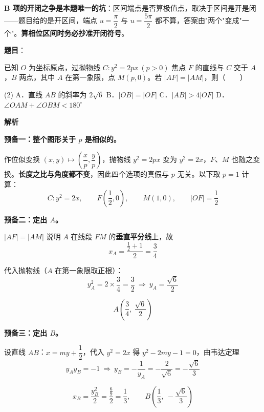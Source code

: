 \begin{answer}
\begin{gktip}
\textbf{B 项的开闭之争是本题唯一的坑}：区间端点是否算极值点，取决于区间是开是闭——题目给的是开区间，端点 $u=\dfrac\pi2$ 与 $u=\dfrac{5\pi}2$ 都不算，答案由"两个"变成"一个"。\textbf{算相位区间时务必抄准开闭符号}。
\end{gktip}


\par\medskip

\end{answer}
\begin{answer}

\textbf{题目}：

已知 $O$ 为坐标原点，过抛物线 $C:y^{2}=2px\ (p>0)$ 焦点 $F$ 的直线与 $C$ 交于 $A$，$B$ 两点，其中 $A$ 在第一象限，点 $M(p,0)$。若 $|AF|=|AM|$，则\mbox{（　　）}

\begin{gkopts}(2)
\task A．直线 $AB$ 的斜率为 $2\sqrt6$
\task B．$|OB|=|OF|$
\task C．$|AB|>4|OF|$
\task D．$\angle OAM+\angle OBM<180^\circ$
\end{gkopts}

\textbf{解析}

\textbf{预备一：整个图形关于 $p$ 是相似的。}

作位似变换 $(x,y)\mapsto\left(\dfrac xp,\dfrac yp\right)$，抛物线 $y^{2}=2px$ 变为 $y^{2}=2x$，$F$、$M$ 也随之变换。\textbf{长度之比与角度都不变}，因此四个选项的真假与 $p$ 无关。以下取 $p=1$ 计算：
\nopagebreak[4]
\[C:y^{2}=2x,\qquad F\left(\frac12,0\right),\qquad M(1,0),\qquad|OF|=\frac12\]

\textbf{预备二：定出 $A$。}

$|AF|=|AM|$ 说明 $A$ 在线段 $FM$ 的\textbf{垂直平分线}上，故
\nopagebreak[4]
\[x_A=\frac{\frac12+1}2=\frac34\]

代入抛物线（$A$ 在第一象限取正根）：
\nopagebreak[4]
\[y_A^{2}=2\times\frac34=\frac32\ \Longrightarrow\ y_A=\frac{\sqrt6}2\]

\nopagebreak[4]
\[A\left(\frac34,\ \frac{\sqrt6}2\right)\]

\textbf{预备三：定出 $B$。}

设直线 $AB$：$x=my+\dfrac12$，代入 $y^{2}=2x$ 得 $y^{2}-2my-1=0$，由韦达定理
\nopagebreak[4]
\[y_Ay_B=-1\ \Longrightarrow\ y_B=-\frac1{y_A}=-\frac2{\sqrt6}=-\frac{\sqrt6}3\]

\nopagebreak[4]
\[x_B=\frac{y_B^{2}}2=\frac{\frac69}2=\frac13,\qquad B\left(\frac13,\ -\frac{\sqrt6}3\right)\]


\end{answer}
